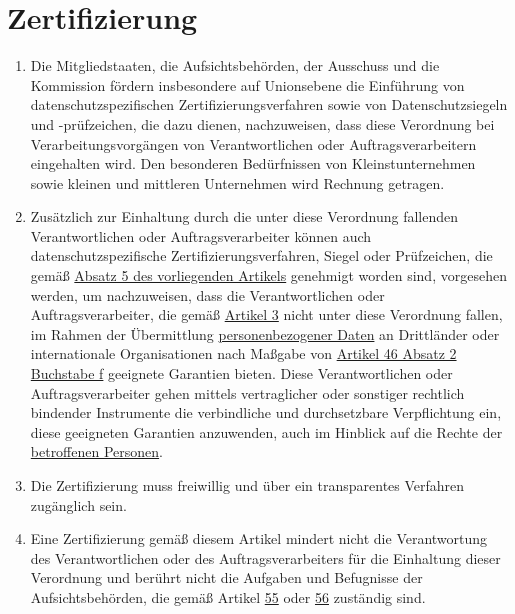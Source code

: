 \chapter{Zertifizierung}
\label{ch:42}


\begin{enumerate}

  \item Die Mitgliedstaaten, die Aufsichtsbehörden, der Ausschuss und die Kommission fördern insbesondere auf
   Unionsebene die Einführung von datenschutzspezifischen Zertifizierungsverfahren sowie von Datenschutzsiegeln
   und -prüfzeichen, die dazu dienen, nachzuweisen, dass diese Verordnung bei Verarbeitungsvorgängen von
   Verantwortlichen oder Auftragsverarbeitern eingehalten wird. Den besonderen Bedürfnissen von Kleinstunternehmen
   sowie kleinen und mittleren Unternehmen wird Rechnung getragen.
  \label{itm:42-1}

  \item Zusätzlich zur Einhaltung durch die unter diese Verordnung fallenden Verantwortlichen oder Auftragsverarbeiter
   können auch datenschutzspezifische Zertifizierungsverfahren, Siegel oder Prüfzeichen, die gemäß \hyperref[itm:42-5]
   {Absatz 5 des vorliegenden Artikels} genehmigt worden sind, vorgesehen werden, um nachzuweisen, dass die
   Verantwortlichen oder Auftragsverarbeiter, die gemäß \hyperref[ch:3]{Artikel 3} nicht unter diese Verordnung
   fallen, im Rahmen der Übermittlung \hyperref[itm:04-1]{personenbezogener Daten} an Drittländer oder internationale Organisationen nach
   Maßgabe von \hyperref[itm:46-2f]{Artikel 46 Absatz 2 Buchstabe f} geeignete Garantien bieten. Diese Verantwortlichen
   oder Auftragsverarbeiter gehen mittels vertraglicher oder sonstiger rechtlich bindender Instrumente die verbindliche
   und durchsetzbare Verpflichtung ein, diese geeigneten Garantien anzuwenden, auch im Hinblick auf die Rechte der
   \hyperref[itm:04-1]{betroffenen Personen}.
  \label{itm:42-2}

  \item Die Zertifizierung muss freiwillig und über ein transparentes Verfahren zugänglich sein.
  \label{itm:42-3}

  \item Eine Zertifizierung gemäß diesem Artikel mindert nicht die Verantwortung des Verantwortlichen oder des
   Auftragsverarbeiters für die Einhaltung dieser Verordnung und berührt nicht die Aufgaben und Befugnisse der
   Aufsichtsbehörden, die gemäß Artikel \hyperref[ch:55]{55} oder \hyperref[ch:56]{56} zuständig sind.
  \label{itm:42-4}


\end{enumerate}
